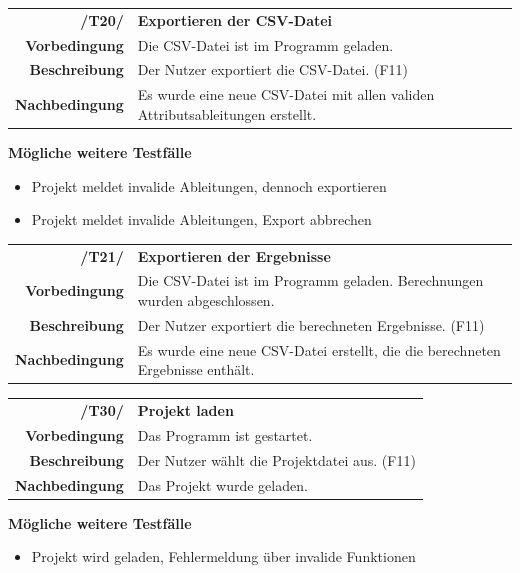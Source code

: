 \documentclass{article}
\begin{document}
\begin{table}[H]
\begin{tabularx}{\textwidth}{rX}
\textbf{/T20/}         & \textbf{Exportieren der CSV-Datei} \\
\textbf{Vorbedingung}  & Die CSV-Datei ist im Programm geladen.   \\
\textbf{Beschreibung}  & Der Nutzer exportiert die CSV-Datei. (F11)                                \\
\textbf{Nachbedingung} & Es wurde eine neue CSV-Datei mit allen validen Attributsableitungen erstellt.
\end{tabularx}
\end{table}
\textbf{Mögliche weitere Testfälle}
\begin{itemize}
    \item Projekt meldet invalide Ableitungen, dennoch exportieren
    \item Projekt meldet invalide Ableitungen, Export abbrechen
\end{itemize}

\begin{table}[H]
\begin{tabularx}{\textwidth}{rX}
\textbf{/T21/}         & \textbf{Exportieren der Ergebnisse}  \\
\textbf{Vorbedingung}  & Die CSV-Datei ist im Programm geladen. Berechnungen wurden abgeschlossen.   \\
\textbf{Beschreibung}  & Der Nutzer exportiert die berechneten Ergebnisse. (F11)                               \\
\textbf{Nachbedingung} & Es wurde eine neue CSV-Datei erstellt, die die berechneten Ergebnisse enthält.
\end{tabularx}
\end{table}

\begin{table}[H]
\begin{tabularx}{\textwidth}{rX}
\textbf{/T30/}         & \textbf{Projekt laden} \\
\textbf{Vorbedingung}  & Das Programm ist gestartet.   \\
\textbf{Beschreibung}  & Der Nutzer wählt die Projektdatei aus. (F11) \\
\textbf{Nachbedingung} & Das Projekt wurde geladen.
\end{tabularx}
\end{table}
\textbf{Mögliche weitere Testfälle}
\begin{itemize}
    \item Projekt wird geladen, Fehlermeldung über invalide Funktionen
\end{itemize}
\end{document}
